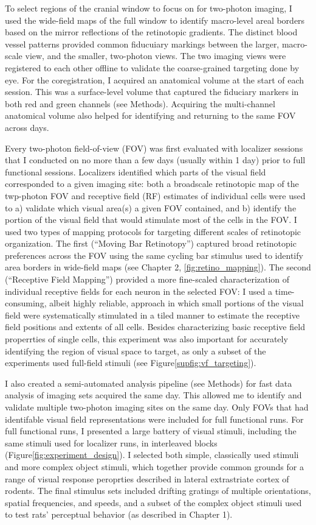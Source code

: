 To select regions of the cranial window to focus on for two-photon imaging, I used the wide-field maps of the full window to identify macro-level areal borders based on the mirror reflections of the retinotopic gradients. The distinct blood vessel patterns provided common fiducuiary markings between the larger, macro-scale view, and the smaller, two-photon views. The two imaging views were registered to each other offline to validate the coarse-grained targeting done by eye. For the coregistration, I acquired an anatomical volume at the start of each session. This was a surface-level volume that captured the fiduciary markers in both red and green channels (see Methods). Acquiring the multi-channel anatomical volume also helped for identifying and returning to the same FOV across days. 

Every two-photon field-of-view (FOV) was first evaluated with localizer sessions that I conducted on no more than a few days (usually within 1 day) prior to full functional sessions. Localizers identified which parts of the visual field corresponded to a given imaging site: both a broadscale retinotopic map of the twp-photon FOV and receptive field (RF) estimates of individual cells were used to a) validate which visual area(s) a given FOV contained, and b) identify the portion of the visual field that would stimulate most of the cells in the FOV. I used two types of mapping protocols for targeting different scales of retinotopic organization. The first (``Moving Bar Retinotopy'') captured broad retinotopic preferences across the FOV using the same cycling bar stimulus used to identify area borders in wide-field maps (see Chapter 2, \ref{fig:retino_mapping}). The second (``Receptive Field Mapping'') provided a more fine-scaled characterization of individual receptive fields for each neuron in the selected FOV:  I used a time-consuming, albeit highly reliable, approach in which small portions of the visual field were systematically stimulated in a tiled manner to estimate the receptive field positions and extents of all cells. Besides characterizing basic receptive field properrties of single cells, this experiment was also important for accurately identifying the region of visual space to target, as only a subset of the experiments used full-field stimuli (see Figure\ref{supfig:vf_targeting}).

I also created a semi-automated analysis pipeline (see Methods) for fast data analysis of imaging sets acquired the same day. This allowed me to identify and validate multiple two-photon imaging sites on the same day. Only FOVs that had identifable visual field representations were included for full functional runs. For full functional runs, I presented a large battery of visual stimuli, including the same stimuli used for localizer runs, in interleaved blocks (Figure\ref{fig:experiment_design}). I selected both simple, classically used stimuli and more complex object stimuli, which together provide common grounds for a range of visual response peroprties described in lateral extrastriate cortex of rodents. The final stimulus sets included drifting gratings of multiple orientations, spatial frequencies, and speeds, and a subset of the complex object stimuli used to test rats' perceptual behavior (as described in Chapter 1).

